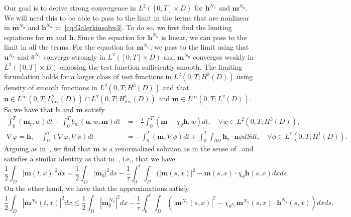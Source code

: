 \documentclass[10pt,letterpaper,twoside]{amsart}
\theoremstyle{definition}{\newtheorem{definition}[lemma]{Definition}}
\theoremstyle{note}{\newtheorem{claim}{Claim}[section]
\newtheorem*{claim*}{Claim}}
\numberwithin{equation}{section}
\newcommand{\dom}{D}
\newcommand{\Grad}{\nabla}
\newcommand{\Div}{\operatorname{div}}
\newcommand{\V}{H^1_{\Div}(\dom)}
\newcommand{\bu}{\mathbf{u}}
\newcommand{\bm}{\mathbf{m}}
\newcommand{\bh}{\mathbf{h}}
\begin{document}
 Our goal is to derive strong convergence in $L^2([0,T]\times\dom)$ for $\bh^{N_u}$ and $\bm^{N_u}$. We will need this to be able to pass to the limit in the terms that are nonlinear in $\bm^{N_u}$ and $\bh^{N_u}$ in~\eqref{eq:Galerkinsolve3}.
  To do so, we first find the limiting equations for $\bm$ and $\bh$. Since the equation for $\bh^{N_u}$ is linear, we can pass to the limit in all the terms. For the equation for $\bm^{N_u}$, we pass to the limit using that $\bu^{N_u}$ and $\theta^{N_u}$ converge strongly in $L^2([0,T]\times\dom)$ and $\bm^{N_u}$ converges weakly in $L^2([0,T]\times\dom)$ choosing the test function sufficiently smooth. 
   The limiting formulation holds for a larger class of test functions in $L^{2}(0,T;H^3(\dom))$ using density of smooth functions in $L^{2}(0,T;H^3(\dom))$  and that $\bu\in L^\infty(0,T;L^2_{\text{div}}(\dom))\cap L^2(0,T;\V)$ and $\bm\in L^\infty(0,T;L^2(\dom))$. 
 So we have that $\bh$ and $\bm$ satisfy 
 \begin{align}
 	\int_0^T(\bm_t,w)dt-\int_0^T b_m(\bu,w,\bm)dt &=-\frac{1}{\tau}\int_0^T (\bm-\chi_{\theta}\bh,w)dt ,\quad \forall w\in L^{2}(0,T;H^3(\dom)), \label{eq:meqdiscrete4}\\
 	\Grad\varphi=\bh,\quad \int_0^T(\Grad \varphi,\Grad \phi)dt  &=-\int_0^T(\bm,\Grad\phi)dt+\int_0^T\int_{\partial\dom}\bh_a\cdot\mathbf{n}\phi dSdt ,\quad \forall \phi\in L^1(0,T;H^1(\dom)).\label{eq:bcmaxwell4}
 \end{align}
  Arguing as in~\cite[Section 3.2]{Nochetto2019}, we find that $\bm$ is a renormalized solution as in the sense of~\cite[Lemma 3.4]{Nochetto2019} and satisfies a similar identity as that in~\cite[Lemma 3.5]{Nochetto2019}, i.e., that we have
 \begin{equation}\label{eq:midentity}
 	 	\frac12\int_{\dom} |\bm(t,x)|^2 dx = \frac12\int_{\dom} |\bm_0|^2 dx -\frac{1}{\tau}\int_0^t\int_{\dom}(|\bm(s,x)|^2-\bm(s,x)\cdot \chi_{\theta} \bh(s,x) dx ds.
 \end{equation}
 On the other hand, we have that the approximations satisfy
  \begin{equation}\label{eq:midentityapprox}
  		\frac12\int_{\dom} |\bm^{N_u}(t,x)|^2 dx\leq \frac12\int_{\dom} |\bm^{N_u}_0|^2 dx%
  	-\frac{1}{\tau}\int_0^t\int_{\dom}(|\bm^{N_u}(s,x)|^2-\chi_{\theta^{N_u}}\bm^{N_u}(s,x)\cdot  \bh^{N_u}(s,x)) dx ds.
 	\end{equation}
\end{document}
